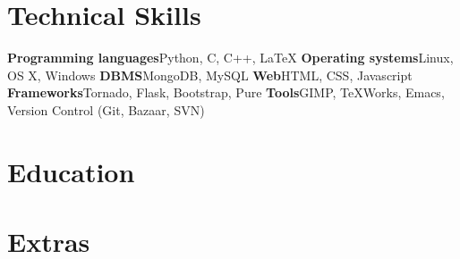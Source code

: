 \documentclass[11pt, a4paper, sans]{moderncv}        %
\begin{document}
\section{Technical Skills}
\cvcomputer
{\textbf{Programming languages}}{Python, C, C++, \LaTeX}
{\textbf{Operating systems}}{Linux, OS X, Windows}
\cvcomputer
{\textbf{DBMS}}{MongoDB, MySQL}
{\textbf{Web}}{HTML, CSS, Javascript}
\cvcomputer
{\textbf{Frameworks}}{Tornado, Flask, Bootstrap, Pure}
{\textbf{Tools}}{GIMP, TeXWorks, Emacs, Version Control (Git, Bazaar, SVN)}
{}

\section{Education}


\section{Extras}
\clearpage
\end{document}
